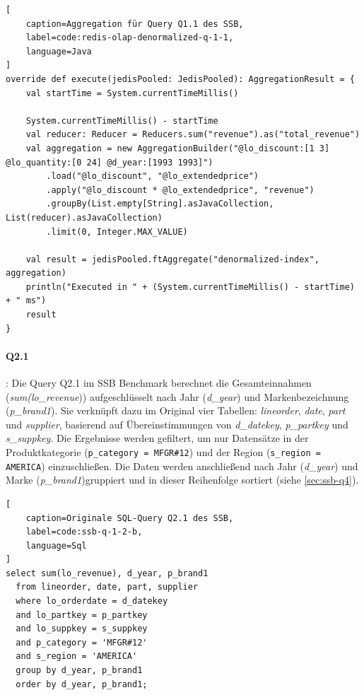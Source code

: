\begin{lstlisting}[
    caption=Aggregation für Query Q1.1 des SSB,
    label=code:redis-olap-denormalized-q-1-1,
    language=Java
]
override def execute(jedisPooled: JedisPooled): AggregationResult = {
	val startTime = System.currentTimeMillis()

	System.currentTimeMillis() - startTime
	val reducer: Reducer = Reducers.sum("revenue").as("total_revenue")
	val aggregation = new AggregationBuilder("@lo_discount:[1 3] @lo_quantity:[0 24] @d_year:[1993 1993]")
		.load("@lo_discount", "@lo_extendedprice")
		.apply("@lo_discount * @lo_extendedprice", "revenue")
		.groupBy(List.empty[String].asJavaCollection, List(reducer).asJavaCollection)
		.limit(0, Integer.MAX_VALUE)

	val result = jedisPooled.ftAggregate("denormalized-index", aggregation)
	println("Executed in " + (System.currentTimeMillis() - startTime) + " ms")
	result
}
\end{lstlisting}


\paragraph{Q2.1}: Die Query Q2.1 im SSB Benchmark berechnet die Gesamteinnahmen\\
(\emph{sum(lo\_revenue})) aufgeschlüsselt nach Jahr (\emph{d\_year}) und Markenbezeichnung\\
(\emph{p\_brand1}).
Sie verknüpft dazu im Original vier Tabellen: \emph{lineorder}, \emph{date}, \emph{part} und \emph{supplier}, basierend auf Übereinstimmungen von \emph{d\_datekey}, \emph{p\_partkey} und \emph{s\_suppkey}. Die Ergebnisse werden gefiltert, um nur Datensätze in der Produktkategorie (\lstinline|p_category = MFGR#12|) und der Region (\lstinline|s_region = AMERICA|) einzuschließen. Die Daten werden anschließend nach Jahr (\emph{d\_year}) und Marke (\emph{p\_brand1})gruppiert und in dieser Reihenfolge sortiert (siehe \cref{sec:ssb-q4}).

\begin{lstlisting}[
    caption=Originale SQL-Query Q2.1 des SSB,
    label=code:ssb-q-1-2-b,
    language=Sql
]
select sum(lo_revenue), d_year, p_brand1
  from lineorder, date, part, supplier
  where lo_orderdate = d_datekey
  and lo_partkey = p_partkey
  and lo_suppkey = s_suppkey
  and p_category = 'MFGR#12'
  and s_region = 'AMERICA'
  group by d_year, p_brand1
  order by d_year, p_brand1;
\end{lstlisting}


